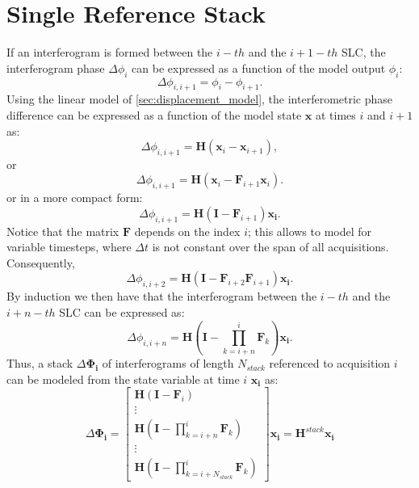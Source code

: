 \documentclass{article}
\begin{document}
\section{Single Reference Stack}
If an interferogram is formed between the $i-th$ and the $i + 1-th$ SLC, the interferogram phase $\Delta\phi_{i}$ can be expressed as a function of the model output $\phi_i$:
\begin{equation}
	\Delta\phi_{i,i+1} = \phi_{i} - \phi_{i + 1}.
\end{equation} 
Using the linear model of \autoref{sec:displacement_model}, the interferometric phase difference can be expressed as a function of the model state $\mathbf{x}$ at times $i$ and $i+1$ as:
\begin{equation}
	\Delta\phi_{i,i+1} = \mathbf{H} \left(\mathbf{x}_i - \mathbf{x}_{i+1}\right),
\end{equation}
or 
\begin{equation}
	\Delta\phi_{i,i+1} = \mathbf{H} \left(\mathbf{x}_i - \mathbf{F}_{i+1}\mathbf{x}_i\right).
\end{equation}
or in a more compact form:
\begin{equation}\label{eq:output_step_1}
	\Delta\phi_{i,i+1} =  \mathbf{H} \left(\mathbf{I} - \mathbf{F}_{i+1} \right) \mathbf{x_i}.
\end{equation}
Notice that the matrix $\mathbf{F}$ depends on the index $i$; this allows to model for variable timesteps, where $\Delta t$ is not constant over the span of all acquisitions.
Consequently,
\begin{equation}\label{eq:output_step_2}
	\Delta\phi_{i,i+2} =  \mathbf{H} \left(\mathbf{I} - \mathbf{F}_{i+2}\mathbf{F}_{i+1} \right) \mathbf{x_i}.
\end{equation}
By induction we then have that the interferogram between the $i-th$ and the $i+n-th$ SLC can be expressed as:
\begin{equation}
	\Delta\phi_{i,i+n} =  \mathbf{H} \left(\mathbf{I} - \prod_{k=i+n}^{i}\mathbf{F}_k\right) \mathbf{x_i}.
\end{equation}
Thus, a stack  $\Delta\mathbf{\Phi_{i}}$ of interferograms of length $N_{stack}$ referenced to acquisition $i$ can be modeled from the state variable at time $i$ $\mathbf{x_{i}}$ as:
\begin{equation}
	\Delta\mathbf{\Phi_{i}} =\begin{bmatrix}
	 	\mathbf{H} \left(\mathbf{I} - \mathbf{F}_i\right)\\
	 	\vdots\\
	 	\mathbf{H} \left(\mathbf{I} - \prod_{k=i+n}^{i}\mathbf{F}_k\right)\\
	 	\vdots\\
	 	\mathbf{H} \left(\mathbf{I} -\prod_{k=i+N_{stack}}^{i}\mathbf{F}_k\right)
	\end{bmatrix}\mathbf{x_i} = \mathbf{H}^{stack} \mathbf{x_i}
\end{equation}
\end{document}
